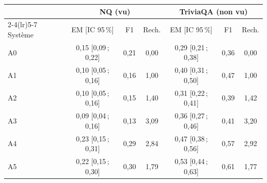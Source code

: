 \begin{tabular}{@{}lcccccc@{}}
\toprule
& \multicolumn{3}{c}{NQ (vu)} & \multicolumn{3}{c}{TriviaQA (non vu)}\\
\cmidrule(lr){2-4}\cmidrule(lr){5-7}
Système & EM [IC 95\,\%] & F1 & Rech. & EM [IC 95\,\%] & F1 & Rech.\\
\midrule
A0 & 0{,}15 [0{,}09\,; 0{,}22] & 0{,}21 & 0{,}00 & 0{,}29 [0{,}21\,; 0{,}38] & 0{,}36 & 0{,}00\\
A1 & 0{,}10 [0{,}05\,; 0{,}16] & 0{,}16 & 1{,}00 & 0{,}40 [0{,}31\,; 0{,}50] & 0{,}47 & 1{,}00\\
A2 & 0{,}10 [0{,}05\,; 0{,}16] & 0{,}15 & 1{,}40 & 0{,}31 [0{,}22\,; 0{,}41] & 0{,}39 & 1{,}42\\
A3 & 0{,}09 [0{,}04\,; 0{,}16] & 0{,}13 & 3{,}09 & 0{,}36 [0{,}27\,; 0{,}46] & 0{,}41 & 3{,}20\\
\midrule
A4 & 0{,}23 [0{,}15\,; 0{,}31] & 0{,}29 & 2{,}84 & 0{,}47 [0{,}38\,; 0{,}56] & 0{,}57 & 2{,}92\\
A5 & 0{,}22 [0{,}15\,; 0{,}30] & 0{,}30 & 1{,}79 & 0{,}53 [0{,}44\,; 0{,}63] & 0{,}61 & 1{,}77\\
\bottomrule
\end{tabular}
